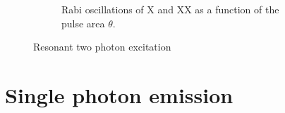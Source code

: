 \begin{figure}[H]
\begin{subfigure}[b]{0.48\textwidth}
		\caption{Rabi oscillations of \ac{X} and \ac{XX} as a function of the pulse area $\theta$.\newline}
		\label{fig:rabi-oscillations}
	\end{subfigure}
	\caption{Resonant two photon excitation~\cite{schimpf_towards_2017}}
	\label{fig:resonant-two-photon-excitation}
\end{figure}
\section{Single photon emission}






